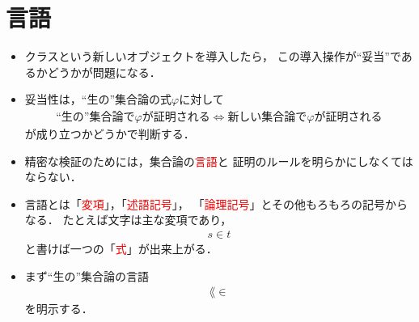 \begin{comment}
		\item 島内では$\varepsilon$項，ブルバキでは$\tau$項．
			
		\item しかし式$\varphi(x)$に対して$\varepsilon x \varphi(x)$なるオブジェクトを項とすると
			\textcolor{red}{項と式の定義が入れ子になってしまう}．
			
\newpage
		\item $\varepsilon$項を活用しつつ入れ子の問題を解消し，
			またクラスの自然な導入により具体的で直観的な集合論を構築．
		
		\item この言語の拡張がZFCの単純な保存拡大ではないのでZFCと厳密にどう関係しているかは未だ不明
			(ZFCで示せることは示せるはず．逆に本稿の集合論で示せることがZFCから示せるかは不明)．
	\end{itemize}
	\end{comment}
	
\section{言語}
	\begin{itemize}
		\item クラスという新しいオブジェクトを導入したら，
			この導入操作が``妥当''であるかどうかが問題になる．
		
		\item 妥当性は，``生の''集合論の式$\varphi$に対して
			\begin{align}
				\mbox{``生の''集合論で$\varphi$が証明される}
				\Longleftrightarrow
				\mbox{新しい集合論で$\varphi$が証明される}
			\end{align}
			が成り立つかどうかで判断する．
		
		\item 精密な検証のためには，集合論の\textcolor{red}{言語}と
			証明のルールを明らかにしなくてはならない．
		
		\item 言語とは「\textcolor{red}{変項}」，「\textcolor{red}{述語記号}」，
			「\textcolor{red}{論理記号}」とその他もろもろの記号からなる．
			たとえば文字は主な変項であり，
			\begin{align}
				s \in t
			\end{align}
			と書けば一つの「\textcolor{red}{式}」が出来上がる．
		
		\item まず``生の''集合論の言語
			\begin{align}
				\lang{\in}
			\end{align}
			を明示する．
	\end{itemize}
		
